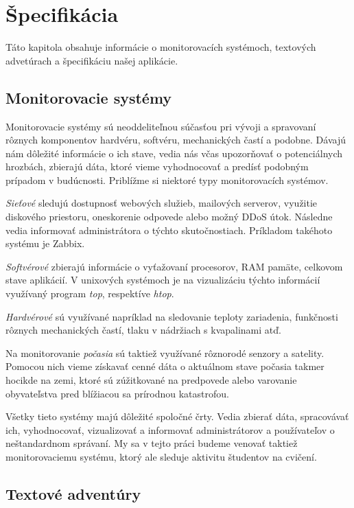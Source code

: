 \chapter{Špecifikácia}
\label{kap:specifikacia}

Táto kapitola obsahuje informácie o monitorovacích systémoch, textových advetúrach a špecifikáciu našej aplikácie.

\section{Monitorovacie systémy}
\label{sec:monitorsystems}

Monitorovacie systémy sú neoddeliteľnou súčasťou pri vývoji a spravovaní rôznych
komponentov hardvéru, softvéru, mechanických častí a podobne. Dávajú nám dôležité
informácie o ich stave, vedia nás včas upozorňovať o potenciálnych hrozbách,
zbierajú dáta, ktoré vieme vyhodnocovať a predísť podobným prípadom v budúcnosti.
Priblížme si niektoré typy monitorovacích systémov.

\textit{Sieťové} sledujú dostupnosť webových služieb, mailových serverov, využitie
diskového priestoru, oneskorenie odpovede alebo možný DDoS útok. Následne vedia informovať administrátora o týchto skutočnostiach. Príkladom takéhoto systému je Zabbix.
~\cite{bib:networkmonitoring}

\textit{Softvérové} zbierajú informácie o vyťažovaní procesorov, RAM pamäte, celkovom
stave aplikácií. V unixových systémoch je na vizualizáciu týchto informácií využívaný
program \textit{top}, respektíve \textit{htop}.

\textit{Hardvérové} sú využívané napríklad na sledovanie teploty zariadenia, funkčnosti rôznych mechanických častí, tlaku v nádržiach s kvapalinami atď. 

Na monitorovanie \textit{počasia} sú taktiež využívané rôznorodé senzory a satelity.
Pomocou nich vieme získavať cenné dáta o aktuálnom stave počasia takmer hocikde
na zemi, ktoré sú zúžitkované na predpovede alebo varovanie obyvateľstva pred
blížiacou sa prírodnou katastrofou.

Všetky tieto systémy majú dôležité spoločné črty. Vedia zbierať dáta, spracovávať ich,
vyhodnocovať, vizualizovať a informovať administrátorov a používateľov o neštandardnom
správaní. My sa v tejto práci budeme venovať taktiež monitorovaciemu systému, ktorý ale sleduje aktivitu študentov na cvičení.

\section{Textové adventúry}
\label{sec:textadventures}

